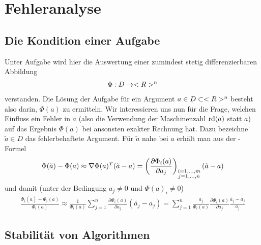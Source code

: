 \section{Fehleranalyse}

\subsection{Die Kondition einer Aufgabe}

Unter Aufgabe wird hier die Auswertung einer zumindest stetig differenzierbaren Abbildung
\begin{align}
	\Phi: D\to<R>^n\notag
\end{align}
verstanden. Die Lösung der Aufgabe für ein Argument $a\in D\subset<R>^n$ besteht also darin, $\Phi(a)$ zu ermitteln. Wir interessieren uns nun für die Frage, welchen Einfluss ein Fehler in $a$ (also die Verwendung der Maschinenzahl $\operatorname{rd}(a)$ statt $a$) auf das Ergebnis $\Phi(a)$ bei ansonsten exakter Rechnung hat. Dazu bezeichne $\tilde{a}\in D$ das fehlerbehaftete Argument. Für $\tilde{a}$ nahe bei $a$ erhält man aus der -Formel
\begin{align}
	\Phi(\tilde{a}) - \Phi(a) \approx\nabla\Phi(a)^T(\tilde{a}-a)= \left( \frac{\partial \Phi_i(a)}{\partial a_j}\right) _{\substack{i=1,...,m \\ j=1,...,n}} (\tilde{a}-a)\notag
\end{align}
und damit (unter der Bedingung $a_j\neq 0$ und $\Phi(a)_i\neq 0$)
\begin{align}
	\label{4.1}
	\frac{\Phi_i(\tilde{a}) - \Phi_i(a)}{\Phi_i(a)} \approx \frac{1}{\Phi_i(a)}\sum_{j=1}^{n}\frac{\partial \Phi_i(a)}{\partial a_j} (\tilde{a_j}-a_j) = \sum_{j=1}^n \frac{a_j}{\Phi_i(a)}\frac{\partial\Phi_i(a)}{\partial a_j}\frac{\tilde{a_j}-a_j}{a_j}
\end{align}

\subsection{Stabilität von Algorithmen}